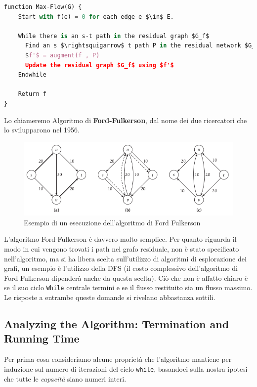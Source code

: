 \begin{lstlisting}[language=Python, mathescape=true]
function Max-Flow(G) {
	Start with f(e) = 0 for each edge e $\in$ E.

	While there is an s-t path in the residual graph $G_f$
  	  Find an s $\rightsquigarrow$ t path P in the residual network $G_f$
  	  $f'$ = augment(f , P)
  	  Update the residual graph $G_f$ using $f'$
	Endwhile

	Return f
}
\end{lstlisting}

Lo chiameremo Algoritmo di \textbf{Ford-Fulkerson}, dal nome dei due
ricercatori che lo svilupparono nel 1956.

\begin{figure}[H]
	\centering
	\includegraphics[width = 12 cm]{capitoli/network_flow/imgs/flow3.png}
	\caption{Esempio di un esecuzione dell'algoritmo di Ford Fulkerson}
\end{figure}

L'algoritmo Ford-Fulkerson è davvero molto semplice. Per quanto riguarda
il modo in cui vengono trovati i path nel grafo residuale, non è stato
specificato nell'algoritmo, ma si ha libera scelta sull'utilizzo di
algoritmi di esplorazione dei grafi, un esempio è l'utilizzo della DFS
(il costo complessivo dell'algoritmo di Ford-Fulkerson dipenderà anche
da questa scelta). Ciò che non è affatto chiaro è se il suo ciclo
\texttt{While} centrale termini e se il flusso restituito sia un flusso
massimo. Le risposte a entrambe queste domande si rivelano abbastanza
sottili.

\subsection{Analyzing the Algorithm: Termination and Running Time}

Per prima cosa consideriamo alcune proprietà che l'algoritmo mantiene
per induzione sul numero di iterazioni del ciclo \texttt{while},
basandoci sulla nostra ipotesi che tutte le \emph{capacità} siano numeri
interi.

